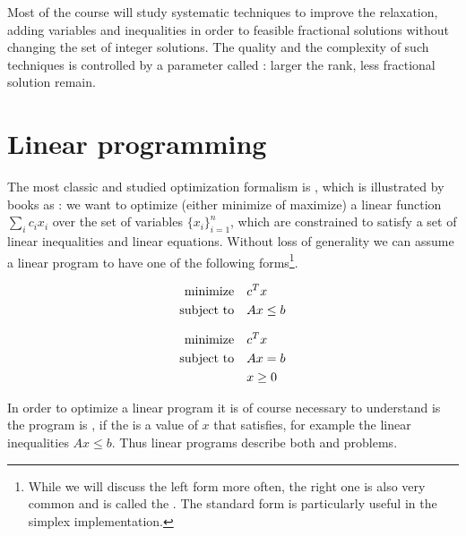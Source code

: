 \documentclass[a4paper,twoside,justified]{tufte-handout}
\begin{document}
Most of the course will study systematic techniques to improve the
relaxation, adding variables and inequalities in order to
 feasible fractional solutions without changing
the set of integer solutions. The quality and the complexity of such
techniques is controlled by a parameter called :
larger the rank, less fractional solution remain.

\section{Linear programming}

The most classic and studied optimization formalism is
, which is illustrated by books as
\cite{matousek2007understanding}: we want to optimize (either minimize
of maximize) a linear function $ \sum_{i} c_{i}x_{i} $ over the set of
variables $ \{x_{i}\}^{n}_{i=1} $, which are constrained to satisfy a
set of linear inequalities and linear equations. Without loss of
generality we can assume a linear program to have one of the following
forms\footnote{While we will discuss the left form more often, the
  right one is also very common and is called the
  . The standard form is particularly
  useful in the simplex implementation.}.

\begin{figure}
\begin{minipage}[t]{0.5\textwidth}
\begin{alignat*}{2}
  \text{minimize}\hspace{1em}& c^{T}x \\
  \text{subject to}\hspace{1em}& Ax \leq b
\end{alignat*}
\end{minipage}
\begin{minipage}[t]{0.5\textwidth}
\begin{alignat*}{2}
  \text{minimize}\hspace{1em}& c^{T}x \\
  \text{subject to}\hspace{1em}& Ax = b\\
  & x \geq 0
\end{alignat*}
\end{minipage}
\end{figure}


In order to optimize a linear program it is of course necessary to
understand is the program is , \ie if the is a
value of $ x $ that satisfies, for example the linear inequalities $Ax
\leq b$. Thus linear programs describe both  and
 problems.
\end{document}
